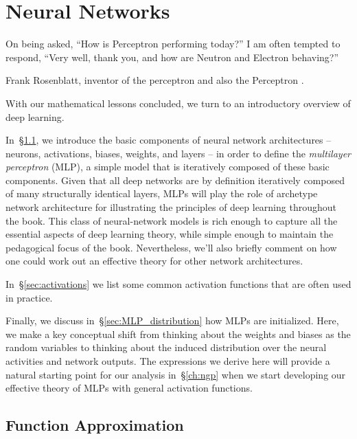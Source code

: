 
\chapter{Neural Networks}
\label{ch:NN}









\epigraph{On being asked, ``How is Perceptron performing today?'' I am often tempted to respond, ``Very well, thank you, and how are Neutron and Electron behaving?''}{Frank Rosenblatt, inventor of the perceptron and also the Perceptron  \cite{rosenblatt1961principles}.}



\noindent{}With our mathematical lessons concluded, we turn to an introductory overview of deep learning.

In~\S\ref{sec:MLP_intro}, we introduce the basic components of neural network architectures -- neurons, activations, biases, weights, and layers -- in order to define the \emph{multilayer perceptron} (MLP),
a simple model that is iteratively composed of these basic components.  Given that all deep networks are by definition iteratively composed of many structurally identical layers, MLPs will play the role of archetype network architecture for illustrating the principles of deep learning throughout the book.
This class of neural-network models is rich enough to capture all the essential aspects of deep learning theory, while simple enough to maintain the pedagogical focus of the book. Nevertheless,
we'll also briefly comment on how one could work out an effective theory for other network architectures.

In~\S\ref{sec:activations} we list some common activation functions that are 
often used in practice.

Finally, we discuss in~\S\ref{sec:MLP_distribution} how MLPs are initialized. %
Here, we make a key conceptual shift from thinking about the weights and biases as the random variables
to thinking about the induced distribution over the neural activities and network outputs.
The expressions we derive here will provide a natural starting point for our analysis in~\S\ref{ch:ngp} when we start developing our effective theory of MLPs with general activation functions.




\section{Function Approximation}\label{sec:MLP_intro}


